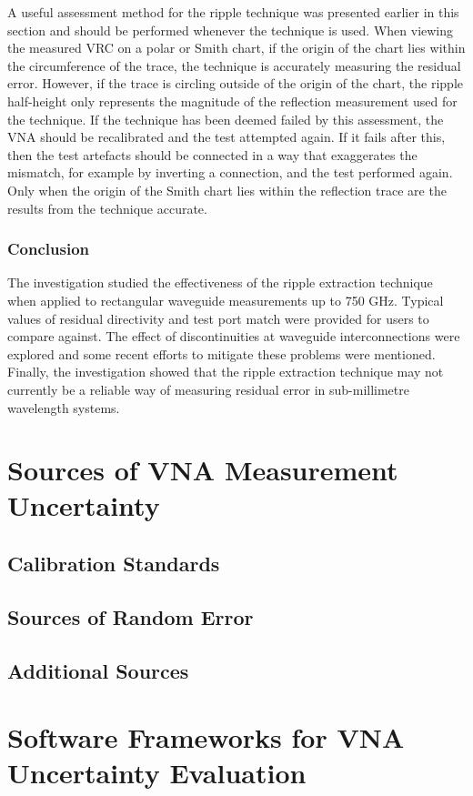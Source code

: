 \documentclass[../thesis/thesis.tex]{subfiles}
\begin{document}
\begin{refsection}
A useful assessment method for the ripple technique was presented earlier in this section and should be performed whenever the technique is used. When viewing the measured VRC on a polar or Smith chart, if the origin of the chart lies within the circumference of the trace, the technique is accurately measuring the residual error. However, if the trace is circling outside of the origin of the chart, the ripple half-height only represents the magnitude of the reflection measurement used for the technique. If the technique has been deemed failed by this assessment, the VNA should be recalibrated and the test attempted again. If it fails after this, then the test artefacts should be connected in a way that exaggerates the mismatch, for example by inverting a connection, and the test performed again. Only when the origin of the Smith chart lies within the reflection trace are the results from the technique accurate.

\subsubsection{Conclusion}

The investigation studied the effectiveness of the ripple extraction technique when applied to rectangular waveguide measurements up to 750 GHz. Typical values of residual directivity and test port match were provided for users to compare against. The effect of discontinuities at waveguide interconnections were explored and some recent efforts to mitigate these problems were mentioned. Finally, the investigation showed that the ripple extraction technique may not currently be a reliable way of measuring residual error in sub-millimetre wavelength systems.


\section{Sources of VNA Measurement Uncertainty}
\subsection{Calibration Standards}
\subsection{Sources of Random Error}
\subsection{Additional Sources}
\section{Software Frameworks for VNA Uncertainty Evaluation}

\end{refsection}
\end{document}
